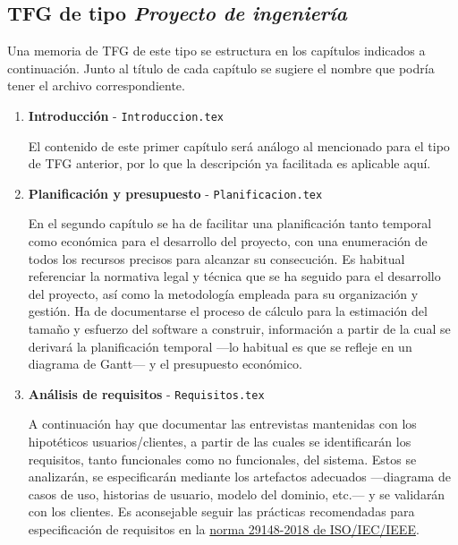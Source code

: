 \subsection{TFG de tipo \textit{Proyecto de ingeniería}}

Una memoria de TFG de este tipo se estructura en los capítulos indicados a continuación. Junto al título de cada capítulo se sugiere el nombre que podría tener el archivo correspondiente.

\begin{enumerate}
	\item \textbf{Introducción} - \texttt{Introduccion.tex} \par
	El contenido de este primer capítulo será análogo al mencionado para el tipo de TFG anterior, por lo que la descripción ya facilitada es aplicable aquí.
	
	\item \textbf{Planificación y presupuesto} - \texttt{Planificacion.tex} \par
	En el segundo capítulo se ha de facilitar una planificación tanto temporal como económica para el desarrollo del proyecto, con una enumeración de todos los recursos precisos para alcanzar su consecución. Es habitual referenciar la normativa legal y técnica que se ha seguido para el desarrollo del proyecto, así como la metodología empleada para su organización y gestión. Ha de documentarse el proceso de cálculo para la estimación del tamaño y esfuerzo del software a construir, información a partir de la cual se derivará la planificación temporal ---lo habitual es que se refleje en un diagrama de Gantt--- y el presupuesto económico.
	
	\item \textbf{Análisis de requisitos} - \texttt{Requisitos.tex} \par
	A continuación hay que documentar las entrevistas mantenidas con los hipotéticos usuarios/clientes, a partir de las cuales se identificarán los requisitos, tanto funcionales como no funcionales, del sistema. Estos se analizarán, se especificarán mediante los artefactos adecuados ---diagrama de casos de uso, historias de usuario, modelo del dominio, etc.--- y se validarán con los clientes. Es aconsejable seguir las prácticas recomendadas para especificación de requisitos en la \href{https://ieeexplore.ieee.org/document/8559686}{norma 29148-2018 de ISO/IEC/IEEE}.
	

\end{enumerate}
